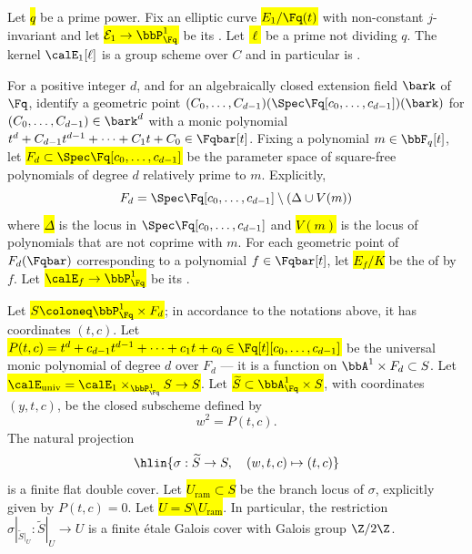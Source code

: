 \begin{context} \label{context:quadratic_twist_of_a_family_of_elliptic_curves_by_a_universal_family_of_polynomials}
    Let \hl{$q$} be a prime power. Fix an elliptic curve \hl{$E_1/\Fq(t)$} with non-constant $j$-invariant and let \hl{$\mathcal{E}_1 \to \bbP^1_{\Fq}$} be its . Let \hl{$\ell$} be a prime not dividing $q$. The kernel $\calE_{1}[\ell]$ is a  group scheme over $C$ and in particular is .

    For a positive integer $d$, and for an algebraically closed extension field $\bark$ of $\Fq$, identify a geometric point $(C_0,\ldots,C_{d-1}) (\Spec \Fq[c_0,\ldots,c_{d-1}])(\bark)$ for $(C_0,\ldots,C_{d-1}) \in \bark^d$ with a monic polynomial $t^d + C_{d-1} t^{d-1} + \cdots + C_1 t + C_0 \in \Fqbar[t]$. Fixing a polynomial $m \in \bbF_q[t]$, let \hl{$F_d \subset \Spec \Fq[c_0,\ldots,c_{d-1}]$} be the parameter space of square-free polynomials of degree $d$ relatively prime to $m$. Explicitly, 
    $$F_d = \Spec \Fq[c_0,\ldots,c_{d-1}] \setminus (\Delta \cup V(m))$$
    where \hl{$\Delta$} is the  locus in $\Spec \Fq[c_0,\ldots,c_{d-1}]$ and \hl{$V(m)$} is the locus of polynomials that are not coprime with $m$. For each geometric point of $F_d(\Fqbar)$ corresponding to a polynomial $f \in \Fqbar[t]$, let \hl{$E_f/K$} be the  of by $f$. Let \hl{$\calE_f \to \bbP_\Fq^1$} be its . 

    Let \hl{$S \coloneq \bbP_\Fq^1 \times F_d$}; in accordance to the notations above, it has coordinates $(t,c)$. Let \hl{$P(t,c) = t^d+c_{d-1} t^{d-1} + \cdots + c_1 t + c_0 \in \Fq[t][c_0,\ldots,c_{d-1}]$} be the universal monic polynomial of degree $d$ over $F_d$ --- it is a function on $\bbA^1 \times F_d \subset S$. Let \hl{$\calE_{\text{univ}} = \calE_1 \times_{\bbP_\Fq^1} S \to S$}. Let \hl{$\widetilde{S} \subset \bbA_\Fq^1 \times S$}, with coordinates $(y,t,c)$, be the closed subscheme defined by 
    $$w^2 = P(t,c).$$
    The natural projection 
    $$\hlin{\sigma: \widetilde{S} \to S, \quad (w,t,c) \mapsto (t,c)}$$
    is a finite flat double cover. Let \hl{$U_{\text{ram}} \subset S$} be the branch locus of $\sigma$, explicitly given by $P(t,c) = 0$. Let \hl{$U = S \setminus U_{\text{ram}}$}. In particular, the restriction $\sigma|_{\widetilde{S}|_U} : \widetilde{S}|_U \to U$ is a finite \'etale Galois cover with Galois group $\Z/2\Z$.


\end{context}
